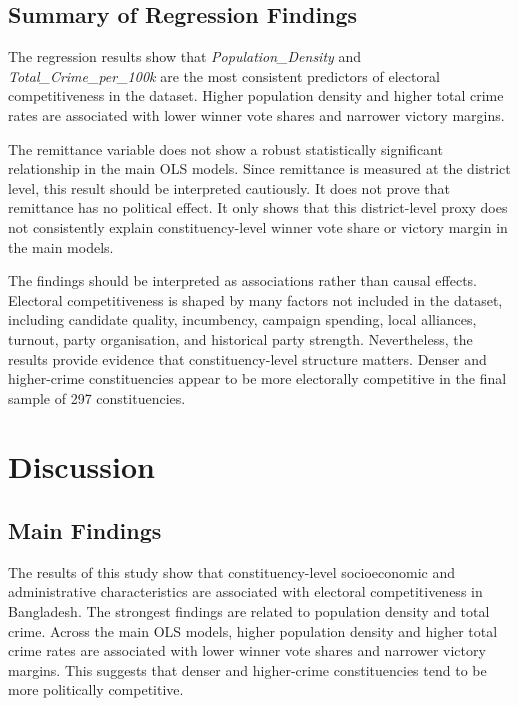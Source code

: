 \documentclass[12pt,a4paper]{article}
\begin{document}
% 
% 

\subsection{Summary of Regression Findings}

The regression results show that \textit{Population\_Density} and \textit{Total\_Crime\_per\_100k} are the most consistent predictors of electoral competitiveness in the dataset. Higher population density and higher total crime rates are associated with lower winner vote shares and narrower victory margins.

The remittance variable does not show a robust statistically significant relationship in the main OLS models. Since remittance is measured at the district level, this result should be interpreted cautiously. It does not prove that remittance has no political effect. It only shows that this district-level proxy does not consistently explain constituency-level winner vote share or victory margin in the main models.

The findings should be interpreted as associations rather than causal effects. Electoral competitiveness is shaped by many factors not included in the dataset, including candidate quality, incumbency, campaign spending, local alliances, turnout, party organisation, and historical party strength. Nevertheless, the results provide evidence that constituency-level structure matters. Denser and higher-crime constituencies appear to be more electorally competitive in the final sample of 297 constituencies.

\section{Discussion}

\subsection{Main Findings}

The results of this study show that constituency-level socioeconomic and administrative characteristics are associated with electoral competitiveness in Bangladesh. The strongest findings are related to population density and total crime. Across the main OLS models, higher population density and higher total crime rates are associated with lower winner vote shares and narrower victory margins. This suggests that denser and higher-crime constituencies tend to be more politically competitive.
\end{document}
